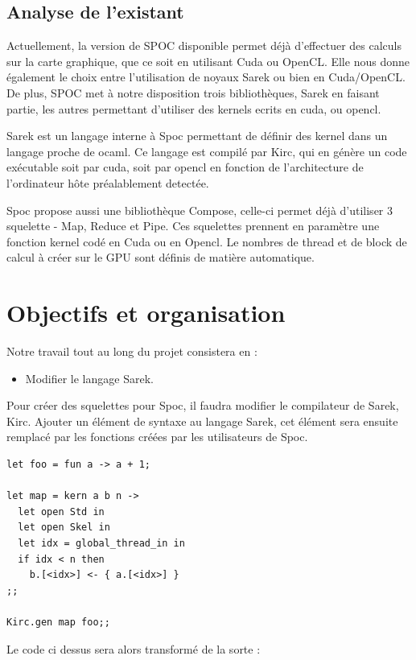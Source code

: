 \documentclass{report}
\begin{document}
\section{Analyse de l'existant}
Actuellement, la version de SPOC disponible permet déjà d’effectuer des calculs sur la carte graphique, que ce soit en utilisant Cuda ou OpenCL. Elle nous donne également le choix entre l’utilisation de noyaux Sarek ou bien en Cuda/OpenCL. De plus, SPOC met à notre disposition trois bibliothèques, Sarek en faisant partie, les autres permettant d’utiliser des kernels ecrits en cuda, ou opencl.\newline

Sarek est un langage interne à Spoc permettant de définir des kernel dans un langage proche de ocaml. Ce langage est compilé par Kirc, qui en génère un code exécutable soit par cuda, soit par opencl en fonction de l’architecture de l’ordinateur hôte préalablement detectée.

Spoc propose aussi une bibliothèque Compose, celle-ci permet déjà d’utiliser 3 squelette - Map, Reduce et Pipe. Ces squelettes prennent en paramètre une fonction kernel codé en Cuda ou en Opencl. Le nombres de thread et de block de calcul à créer sur le GPU sont définis de matière automatique. 
  
\chapter{Objectifs et organisation}

Notre travail tout au long du projet consistera en :
\begin{itemize}
\item Modifier le langage Sarek.
\end{itemize}

Pour créer des squelettes pour Spoc, il faudra modifier le compilateur de Sarek, Kirc. Ajouter un élément de syntaxe au langage Sarek, cet élément sera ensuite remplacé par les fonctions créées par les utilisateurs de Spoc. 

\begin{lstlisting}
let foo = fun a -> a + 1;

let map = kern a b n ->
  let open Std in
  let open Skel in
  let idx = global_thread_in in
  if idx < n then
    b.[<idx>] <- { a.[<idx>] }
;;

Kirc.gen map foo;; 
\end{lstlisting}

Le code ci dessus sera alors transformé de la sorte :
\end{document}
